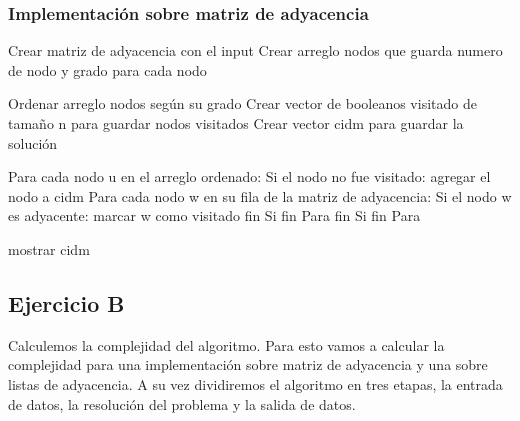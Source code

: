 \subsubsection{Implementación sobre matriz de adyacencia}
\begin{codesnippet}
Crear matriz de adyacencia con el input
Crear arreglo nodos que guarda numero de nodo y grado para cada nodo

Ordenar arreglo nodos según su grado
Crear vector de booleanos visitado de tamaño n para guardar nodos visitados
Crear vector cidm para guardar la solución

Para cada nodo u en el arreglo ordenado:
	Si el nodo no fue visitado:
		agregar el nodo a cidm
		Para cada nodo w en su fila de la matriz de adyacencia:
			Si el nodo w es adyacente:
				marcar w como visitado
			fin Si
		fin Para
	fin Si
fin Para

mostrar cidm
\end{codesnippet}

\subsection{Ejercicio B}
Calculemos la complejidad del algoritmo. Para esto vamos a calcular la complejidad para una implementación sobre matriz de adyacencia y una sobre listas de adyacencia. A su vez dividiremos el algoritmo en tres etapas, la entrada de datos, la resolución del problema y la salida de datos. \\

